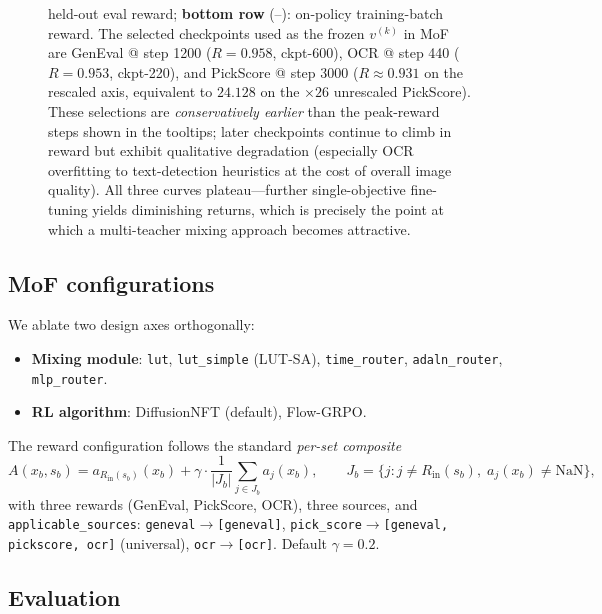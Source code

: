 \documentclass[11pt,a4paper]{article}
\theoremstyle{definition}
\begin{document}
\begin{figure}[ht]
{held-out eval reward; \textbf{bottom row}
(--):
on-policy training-batch reward. The selected checkpoints used as the
frozen $v^{(k)}$ in MoF are GenEval @ step 1200 ($R{=}0.958$, ckpt-600),
OCR @ step 440 ($R{=}0.953$, ckpt-220), and PickScore @ step 3000
($R{\approx}0.931$ on the rescaled axis, equivalent to $24.128$ on the
$\times 26$ unrescaled PickScore). These selections are
\emph{conservatively earlier} than the peak-reward steps shown in the
tooltips; later checkpoints continue to climb in reward but exhibit
qualitative degradation (especially OCR overfitting to text-detection
heuristics at the cost of overall image quality). All three curves
plateau---further single-objective fine-tuning yields diminishing returns,
which is precisely the point at which a multi-teacher mixing approach
becomes attractive.}
\label{fig:teacher_training}
\end{figure}

\subsection{MoF configurations}

We ablate two design axes orthogonally:
\begin{itemize}[leftmargin=1.5em]
\item \textbf{Mixing module}: \texttt{lut}, \texttt{lut\_simple} (LUT-SA),
\texttt{time\_router}, \texttt{adaln\_router}, \texttt{mlp\_router}.
\item \textbf{RL algorithm}: DiffusionNFT (default), Flow-GRPO.
\end{itemize}

The reward configuration follows the standard \emph{per-set composite}
\begin{equation}
A(x_b, s_b)
= a_{R_{\text{in}}(s_b)}(x_b)
+ \gamma\cdot\frac{1}{|J_b|}\sum_{j\in J_b}a_j(x_b),\qquad
J_b = \{j: j\neq R_{\text{in}}(s_b),\;a_j(x_b)\neq\mathrm{NaN}\},
\label{eq:advantage}
\end{equation}
with three rewards (GenEval, PickScore, OCR), three sources, and
\texttt{applicable\_sources}:
\texttt{geneval}$\to$\texttt{[geneval]},
\texttt{pick\_score}$\to$\texttt{[geneval, pickscore, ocr]} (universal),
\texttt{ocr}$\to$\texttt{[ocr]}. Default $\gamma=0.2$.

\subsection{Evaluation}
\end{document}
